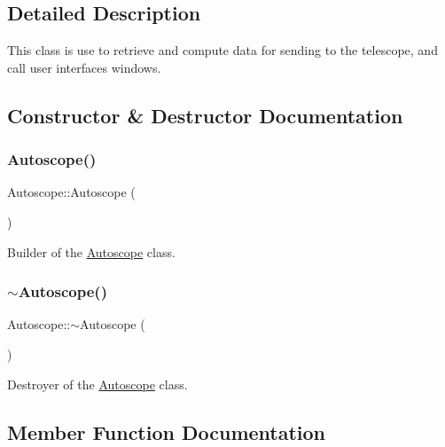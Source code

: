 \subsection{Detailed Description}
This class is use to retrieve and compute data for sending to the telescope, and call user interfaces windows. 

\subsection{Constructor \& Destructor Documentation}
\mbox{\label{class_autoscope_a70213dc05856f7f6592d089d14f08f68}} 
\subsubsection{\texorpdfstring{Autoscope()}{Autoscope()}}
{\footnotesize\ttfamily Autoscope\+::\+Autoscope (\begin{DoxyParamCaption}{ }\end{DoxyParamCaption})}



Builder of the \mbox{\hyperlink{class_autoscope}{Autoscope}} class. 

\mbox{\label{class_autoscope_a8ed25b0eb945f3d2a2a3652322b14b42}} 
\subsubsection{\texorpdfstring{$\sim$Autoscope()}{~Autoscope()}}
{\footnotesize\ttfamily Autoscope\+::$\sim$\+Autoscope (\begin{DoxyParamCaption}{ }\end{DoxyParamCaption})\hspace{0.3cm}{\ttfamily [virtual]}}



Destroyer of the \mbox{\hyperlink{class_autoscope}{Autoscope}} class. 



\subsection{Member Function Documentation}
\mbox{\label{class_autoscope_a2bf2306aa6d3f37dadd83e6e00a35ff3}} 
